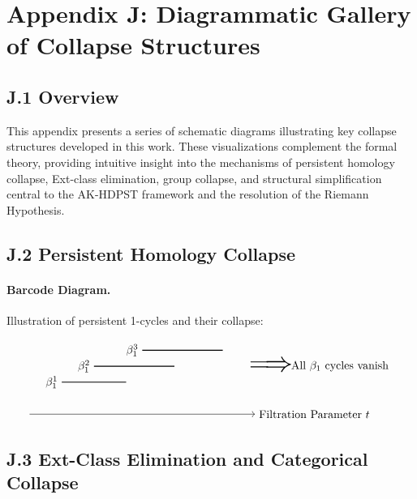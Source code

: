 \documentclass[11pt]{article}
\begin{document}
\section*{Appendix J: Diagrammatic Gallery of Collapse Structures}

\subsection*{J.1 Overview}

This appendix presents a series of schematic diagrams illustrating key collapse structures developed in this work. These visualizations complement the formal theory, providing intuitive insight into the mechanisms of persistent homology collapse, Ext-class elimination, group collapse, and structural simplification central to the AK-HDPST framework and the resolution of the Riemann Hypothesis.

\subsection*{J.2 Persistent Homology Collapse}

\paragraph{Barcode Diagram.}  
Illustration of persistent 1-cycles and their collapse:

\[
\begin{tikzpicture}[scale=1.0]
  \draw[->] (0,0) -- (7,0) node[right] {Filtration Parameter $t$};

  \draw[thick] (1,1) -- (3,1); \node[left] at (1,1) {$\beta_1^1$};
  \draw[thick] (2,1.5) -- (4.5,1.5); \node[left] at (2,1.5) {$\beta_1^2$};
  \draw[thick] (3.5,2) -- (6,2); \node[left] at (3.5,2) {$\beta_1^3$};

  \node at (7.5,1.5) {\Huge$\Longrightarrow$};
  \node[right] at (8,1.5) {All $\beta_1$ cycles vanish};
\end{tikzpicture}
\]

\subsection*{J.3 Ext-Class Elimination and Categorical Collapse}
\end{document}
